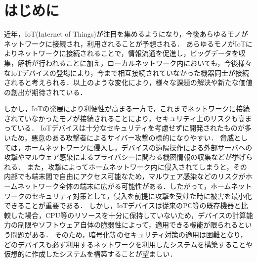 \documentclass[Japanese]{dicomopapers}
\begin{document}
\section{はじめに}
近年，IoT(Internet of Things)が注目を集めるようになり，今後あらゆるモノがネットワークに接続され，利用されることが予想される．
あらゆるモノがIoTによりネットワークに接続されることで，情報流通を促進し，ビッグデータを収集，解析が行われることに加え，ローカルネットワーク内においても，今後様々なIoTデバイスの登場により，今まで相互接続されていなかった機器同士が接続されると考えられる．以上のような変化により，様々な課題の解決や新たな価値の創出が期待されている．\par
しかし，IoTの発展により利便性が高まる一方で，これまでネットワークに接続されていなかったモノが接続されることにより，セキュリティ上のリスクも高まっている\cite{security}．
IoTデバイスは十分なセキュリティを考慮せずに開発されたものが多いため，悪意のある攻撃者によるサイバー攻撃の標的になりやすい．
脅威としては，ホームネットワークに侵入し，デバイスの遠隔操作による外部サーバへの攻撃やマルウェア感染によるプライバシーに関わる機密情報の収集などが挙げられる．
また，攻撃によってホームネットワーク内に侵入されてしまうと，その内部でも端末間で自由にアクセス可能なため，マルウェア感染などのリスクがホームネットワーク全体の端末に広がる可能性がある．したがって，ホームネットワークのセキュリティ対策として，侵入を前提に攻撃を受けた時に被害を最小化できることが重要である．
しかし，IoTデバイスは従来のPC等の既存機器と比較した場合，CPU等のリソースを十分に保持していないため，デバイスの計算能力の制限やソフトウェア自体の脆弱性によって，適用できる機能が限られるという問題がある．
そのため，暗号化等のセキュリティ対策の適用は困難となり，どのデバイスも必ず利用するネットワークを利用したシステムを構築することや仮想的に作成したシステムを構築することが望ましい．\par
\end{document}
